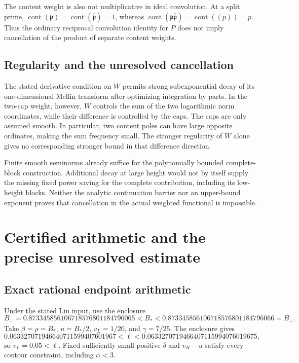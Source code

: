 \documentclass[11pt]{article}
\numberwithin{equation}{section}
\newcommand{\cont}{\operatorname{cont}}
\begin{document}
The content weight is also not multiplicative in ideal convolution.
At a split prime,
\(\cont(\mathfrak p)=\cont(\overline{\mathfrak p})=1\), whereas
\(\cont(\mathfrak p\overline{\mathfrak p})=\cont((p))=p\).
Thus the ordinary reciprocal convolution identity for \(P\)
does not imply cancellation of the product of separate content
weights.

\subsection{Regularity and the unresolved cancellation}

The stated derivative condition on \(W\) permits strong
subexponential decay of its one-dimensional Mellin transform
after optimizing integration by parts. In the two-cap weight,
however, \(W\) controls the sum of the two logarithmic norm
coordinates, while their difference is controlled by the caps.
The caps are only assumed smooth. In particular, two content poles
can have large opposite ordinates, making the sum frequency small.
The stronger regularity of \(W\) alone gives no corresponding
stronger bound in that difference direction.

Finite smooth seminorms already suffice for the polynomially
bounded complete-block construction. Additional decay at large
height would not by itself supply the missing fixed power saving
for the complete contribution, including its low-height blocks.
Neither the analytic continuation barrier nor an upper-bound
exponent proves that cancellation in the actual weighted
functional is impossible.


\section{Certified arithmetic and the precise unresolved
estimate}\label{certified-arithmetic-and-the-precise-unresolved-estimate}

\subsection{Exact rational endpoint
arithmetic}\label{exact-rational-endpoint-arithmetic}

Under the stated Liu input, use the enclosure \[
 B_-=
 0.873345856106718576801184796065
 <B_*<
 0.873345856106718576801184796066
 =B_+.
\] Take \(\beta=\rho=B_*\), \(u=B_*/2\), \(v_L=1/20\), and
\(\gamma=7/25\). The enclosure gives \[
 0.063327071946640711599407601967
 <\ell<
 0.0633270719466407115994076019675,
\] so \(v_L=0.05<\ell\). Fixed sufficiently small positive \(\delta\)
and \(v_R-u\) satisfy every contour constraint, including \(\alpha<3\).
\end{document}
